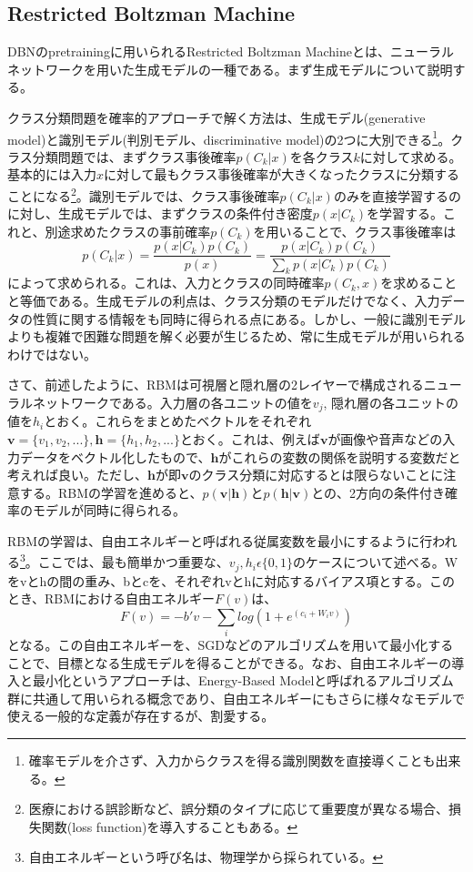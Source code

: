 \subsection{Restricted Boltzman Machine}
DBNのpretrainingに用いられるRestricted Boltzman Machine\cite{smolensky1986information}とは、ニューラルネットワークを用いた生成モデルの一種である。まず生成モデルについて説明する。\par
クラス分類問題を確率的アプローチで解く方法は、生成モデル(generative model)と識別モデル(判別モデル、discriminative model)の2つに大別できる\cite{bishop2006pattern}\footnote{確率モデルを介さず、入力からクラスを得る識別関数を直接導くことも出来る。}。クラス分類問題では、まずクラス事後確率$p(C_k|x)$を各クラス$k$に対して求める。基本的には入力$x$に対して最もクラス事後確率が大きくなったクラスに分類することになる\footnote{医療における誤診断など、誤分類のタイプに応じて重要度が異なる場合、損失関数(loss function)を導入することもある。}。識別モデルでは、クラス事後確率$p(C_k|x)$のみを直接学習するのに対し、生成モデルでは、まずクラスの条件付き密度$p(x|C_k)$を学習する。これと、別途求めたクラスの事前確率$p(C_k)$を用いることで、クラス事後確率は
\begin{equation}
p(C_k|x) = \frac{p(x | C_k)p(C_k)}{p(x)} = \frac{p(x | C_k)p(C_k)}{\sum_{k}p(x | C_k)p(C_k)}
\end{equation}
によって求められる。これは、入力とクラスの同時確率$p(C_k, x)$を求めることと等価である。生成モデルの利点は、クラス分類のモデルだけでなく、入力データの性質に関する情報をも同時に得られる点にある。しかし、一般に識別モデルよりも複雑で困難な問題を解く必要が生じるため、常に生成モデルが用いられるわけではない。\par
さて、前述したように、RBMは可視層と隠れ層の2レイヤーで構成されるニューラルネットワークである。入力層の各ユニットの値を$v_j$, 隠れ層の各ユニットの値を$h_i$とおく。これらをまとめたベクトルをそれぞれ$\bm{v}=\{v_1, v_2, ...\}, \bm{h}=\{h_1, h_2, ...\}$とおく。これは、例えば$\bm{v}$が画像や音声などの入力データをベクトル化したもので、$\bm{h}$がこれらの変数の関係を説明する変数だと考えれば良い。ただし、$\bm{h}$が即$\bm{v}$のクラス分類に対応するとは限らないことに注意する。RBMの学習を進めると、$p(\bm{v}|\bm{h})$と$p(\bm{h}|\bm{v})$との、2方向の条件付き確率のモデルが同時に得られる。\par
RBMの学習は、自由エネルギーと呼ばれる従属変数を最小にするように行われる\footnote{自由エネルギーという呼び名は、物理学から採られている。}。ここでは、最も簡単かつ重要な、$v_j, h_i\epsilon\{0,1\}$のケースについて述べる。Wをvとhの間の重み、bとcを、それぞれvとhに対応するバイアス項とする。このとき、RBMにおける自由エネルギー$F(v)$は、
\begin{equation}
F(v) = -b' v-\sum_{i}log(1+e^{(c_i+W_{i}v)})
\end{equation}
となる。この自由エネルギーを、SGDなどのアルゴリズムを用いて最小化することで、目標となる生成モデルを得ることができる。なお、自由エネルギーの導入と最小化というアプローチは、Energy-Based Modelと呼ばれるアルゴリズム群に共通して用いられる概念であり、自由エネルギーにもさらに様々なモデルで使える一般的な定義が存在するが、割愛する。
